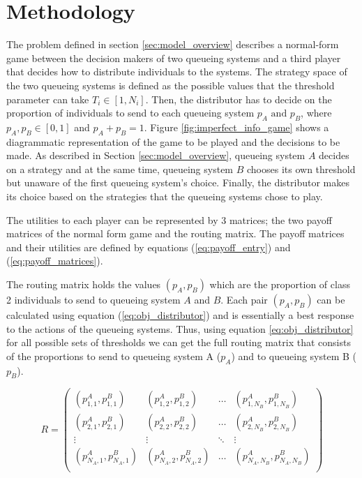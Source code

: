 \section{Methodology}\label{sec:methodology}

The problem defined in section \ref{sec:model_overview} describes a normal-form
game between the decision makers of two queueing systems and a third player that 
decides how to distribute individuals to the systems.
The strategy space of the two queueing systems is defined as the possible values
that the threshold parameter can take \(T_i \in [1, N_i]\).
Then, the distributor has to decide on the proportion of individuals to send to 
each queueing system \(p_A \text{ and } p_B\), where \(p_A, p_B \in [0, 1] \)
and \(p_A + p_B = 1\).
Figure \ref{fig:imperfect_info_game} 
shows a diagrammatic representation of the game to be played and the decisions 
to be made.
As described in Section \ref{sec:model_overview}, queueing system \(A\) decides
on a strategy and at the same time, queueing system \(B\) chooses its own 
threshold but unaware of the first queueing system's choice.
Finally, the distributor makes its choice based on the strategies that the 
queueing systems chose to play. 

The utilities to each player can be represented by 3 matrices; the two payoff 
matrices of the normal form game and the routing matrix.
The payoff matrices and their utilities are defined by equations 
(\ref{eq:payoff_entry}) and (\ref{eq:payoff_matrices}).

The routing matrix holds the values \((p_A, p_B)\) which are the proportion 
of class 2 individuals to send to queueing system \(A\) and \(B\).
Each pair \((p_A, p_B)\) can be calculated using equation 
(\ref{eq:obj_distributor}) and is essentially
a best response to the actions of the queueing systems.
Thus, using equation \ref{eq:obj_distributor} for all possible sets of 
thresholds we can get the full routing matrix that consists of the proportions
to send to queueing system A (\(p_A\)) and to queueing system B (\(p_B\)).

\begin{equation}\label{eq:routing_matrix}
    R = 
    \begin{pmatrix}
        (p_{1,1}^A, p_{1,1}^B) & (p_{1,2}^A, p_{1,2}^B) & \dots & 
        (p_{1,N_B}^A, p_{1,N_B}^B) \\
        (p_{2,1}^A, p_{2,1}^B) & (p_{2,2}^A, p_{2,2}^B) & \dots & 
        (p_{2,N_B}^A, p_{2,N_B}^B) \\
        \vdots & \vdots & \ddots & \vdots \\
        (p_{N_A,1}^A, p_{N_A,1}^B) & (p_{N_A,2}^A, p_{N_A,2}^B) & \dots & 
        (p_{N_A,N_B}^A, p_{N_A,N_B}^B) \\
    \end{pmatrix}
\end{equation}

